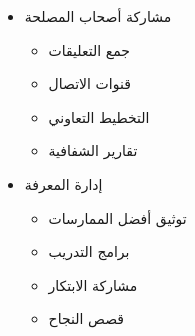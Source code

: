 \begin{itemize}
\begin{itemize}
        \item مشاركة أصحاب المصلحة
        \begin{itemize}
            \item جمع التعليقات
            \item قنوات الاتصال
            \item التخطيط التعاوني
            \item تقارير الشفافية
        \end{itemize}
        
        \item إدارة المعرفة
        \begin{itemize}
            \item توثيق أفضل الممارسات
            \item برامج التدريب
            \item مشاركة الابتكار
            \item قصص النجاح
        \end{itemize}
    \end{itemize}
\end{itemize}
